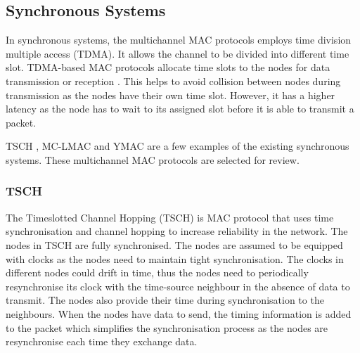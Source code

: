 
\subsection{Synchronous Systems}
In synchronous systems, the multichannel MAC protocols employs time division multiple access (TDMA). It allows the channel to be divided into different time slot. TDMA-based MAC protocols allocate time slots to the nodes for data transmission or reception \cite{y-mac}. This helps to avoid collision between nodes during transmission as the nodes have their own time slot. However, it has a higher latency as the node has to wait to its assigned slot before it is able to transmit a packet. 

TSCH \cite{tsch}, MC-LMAC \cite{mc-lmac} and YMAC \cite{y-mac} are a few examples of the existing synchronous systems. These multichannel MAC protocols are selected for review. 






\subsubsection{TSCH}
The Timeslotted Channel Hopping (TSCH) \cite{tsch} is MAC protocol that uses time synchronisation and channel hopping to increase reliability in the network. The nodes in TSCH are fully synchronised. The nodes are assumed to be equipped with clocks as the nodes need to maintain tight synchronisation. The clocks in different nodes could drift in time, thus the nodes need to periodically resynchronise its clock with the time-source neighbour in the absence of data to transmit. The nodes also provide their time during synchronisation to the neighbours. When the nodes have data to send, the timing information is added to the packet which simplifies the synchronisation process as the nodes are resynchronise each time they exchange data.

